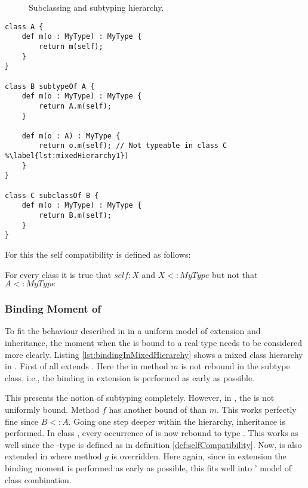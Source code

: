 \begin{figure}[ht]
	\centering
	\caption{Subclassing and subtyping hierarchy.}
	\label{fig:hierarchy}
\end{figure}

\begin{lstlisting}[float=ht,language=ooplss,caption=Mixed extension and inheritance hierarchy.,label=lst:mixedHierarchy]
class A {
	def m(o : MyType) : MyType {
		return m(self);
	}
}

class B subtypeOf A {
	def m(o : MyType) : MyType {
		return A.m(self);
	}

	def m(o : A) : MyType {
		return o.m(self); // Not typeable in class C %\label{lst:mixedHierarchy1})
	}
}

class C subclassOf B {
	def m(o : MyType) : MyType {
		return B.m(self);
	}
}
\end{lstlisting}

For this the self compatibility is defined as follows:

\begin{defn}
	\label{def:selfCompatibility}
	For every class \A it is true that $self : X$ and $X <: MyType$ but not that $A <: MyType$
\end{defn}

\subsubsection{Binding Moment of \mytype}
To fit the behaviour described in  in a
uniform model of extension and inheritance, the moment when the \mytype is
bound to a real type needs to be considered more clearly. Listing
\ref{lst:bindingInMixedHierarchy} shows a mixed class hierarchy in
\ooplss. First of all \B extends \A. Here the \mytype in method $m$ is
not rebound in the subtype class, i.e., the \mytype binding in extension
is performed as early as possible.

This presents the notion of subtyping completely. However, in \B, the \mytype
is not uniformly bound. Method $f$ has another bound of \mytype than
$m$. This works perfectly fine since $B <: A$. Going one step deeper within
the hierarchy, inheritance is performed. In class \C, every occurrence
of \mytype is now rebound to type \C. This works as well since the
\self-type is defined as in definition \ref{def:selfCompatibility}. Now,
\C is also extended in \D where method $g$ is overridden. Here again,
since in extension the binding moment is performed as early as possible,
this fits well into \ooplss' model of class combination.

